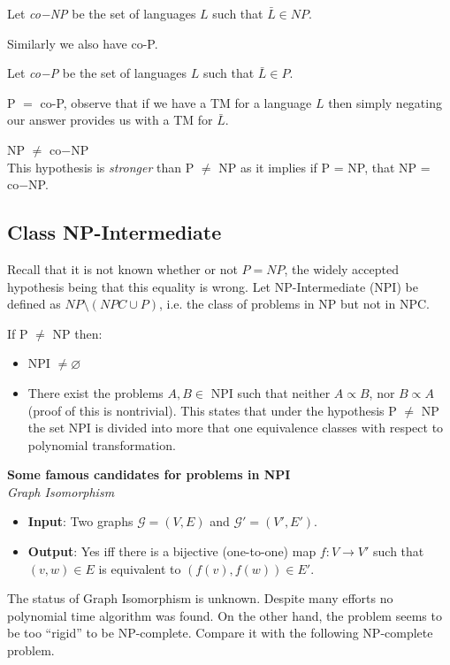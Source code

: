 \begin{definition}
    Let \textit{co−NP} be the set of languages $L$ such that $\bar{L} \in NP$.
\end{definition}
Similarly we also have co-P.
\begin{definition}
    Let \textit{co−P} be the set of languages $L$ such that $\bar{L} \in P$.
\end{definition}

\begin{theorem}
    P $=$ co-P, observe that if we have a TM for a language $L$
    then simply negating our answer provides us with a TM for $\bar{L}$.
\end{theorem}

\begin{hypothesis}
    NP $\neq$ co−NP\\
    This hypothesis is \textit{stronger} than P $\neq$ NP
    as it implies if P = NP, that NP = co−NP.
\end{hypothesis}


\subsection{Class NP-Intermediate}
Recall that it is not known whether or not $P = NP$,
the widely accepted hypothesis being that this equality is wrong.
Let NP-Intermediate (NPI) be defined as $NP \setminus (NPC \cup P)$,
i.e. the class of problems in NP but not in NPC.
\begin{theorem}
    If P $\neq$ NP then:
    \begin{itemize}
        \item NPI $\neq \varnothing$
        \item There exist the problems $A,B \in$ NPI such that
            neither $A \propto B$, nor $B \propto A$
            (proof of this is nontrivial).
            This states that under the hypothesis P $\neq$ NP
            the set NPI is divided into more that one equivalence classes
            with respect to polynomial transformation.
    \end{itemize}
\end{theorem}

\textbf{Some famous candidates for problems in NPI}\\

\textit{Graph Isomorphism}
\begin{itemize}
    \item \textbf{Input}:
        Two graphs $\mathcal{G} = (V, E)$
        and $\mathcal{G}\prime = (V\prime, E\prime)$.
    \item \textbf{Output}:
        Yes iff there is a bijective (one-to-one) map $f: V \rightarrow V\prime$
        such that $(v,w) \in E$ is equivalent to $(f(v),f(w)) \in E\prime$.
\end{itemize}
The status of Graph Isomorphism is unknown.
Despite many efforts no polynomial time algorithm was found.
On the other hand, the problem seems to be too “rigid” to be NP-complete.
Compare it with the following NP-complete problem.\\

